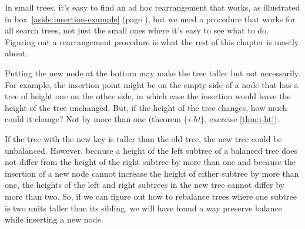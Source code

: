 In small trees, it's easy to find an ad hoc rearrangement that works, %
as illustrated in box~\ref{aside:insertion-example}
(page \pageref{aside:insertion-example}),
but we need a procedure that works for all search trees,
not just the small ones where it's easy to see what to do. %
Figuring out a rearrangement procedure is what the rest
of this chapter is mostly about.

Putting the new node at the bottom may make the tree taller
but not necessarily.
For example, the insertion point might be on the
empty side of a node that has a tree of height one on the other side,
in which case the insertion would leave the height of the tree unchanged.
But, if the height of the tree changes,
how much could it change?
Not by more than one
(theorem \{\emph{i-ht}\}, exercise \ref{thm:i-ht}).

If the tree with the new key is taller than the old tree,
the new tree could be unbalanced.
However, because a height of the left subtree of a
balanced tree does not differ from the height of
the right subtree by more than one
and because the insertion of a new node cannot increase
the height of either subtree by more than one,
the heights of the left and right subtrees in the new tree
cannot differ by more than two.
So, if we can figure out how to rebalance trees where
one subtree is two units taller than its sibling,
we will have found a way preserve balance
while inserting a new node.

